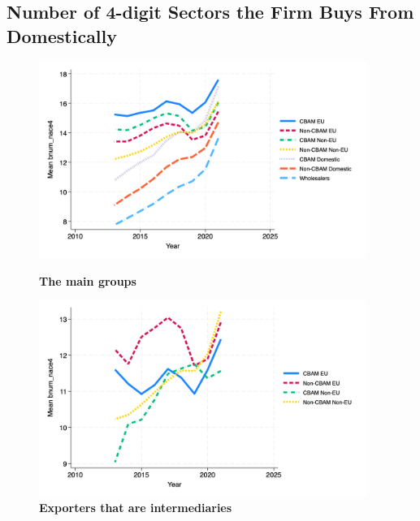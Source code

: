 \documentclass{article}
\begin{document}
\subsection{Number of 4-digit Sectors the Firm Buys From Domestically}
\begin{figure}[H]
\centering
\includegraphics[width=0.95\textwidth]{bnum_nace4_main_groups.png}
\caption{\textbf{The main groups}}
\includegraphics[width=0.95\textwidth]{bnum_nace4_ei.png}
\caption{\textbf{Exporters that are intermediaries}}
\end{figure}
\end{document}
